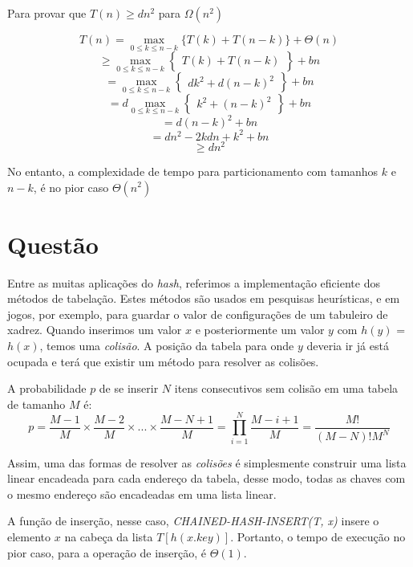 \documentclass[a4paper,12pt]{article}
\begin{document}
\begin{description}
	Para provar que $T(n) \ge dn^2$ para $\Omega(n^2)$
	
	$$ T(n) = \max_{0 \leq k \leq n-k} \{T(k)+T(n-k)\}+\Theta(n) $$
	$$
	{\ge} \max_{0 \leq k \leq n-k} \left\{\begin{array}{rc}
	T(k)+T(n-k)
	\end{array}\right\} + bn
	$$ 
	$$
	=\max_{0 \leq k \leq n-k} \left\{\begin{array}{rc}
	dk^2+d(n-k)^2
	\end{array}\right\} + bn
	$$ 
	$$
	=d \max_{0 \leq k \leq n-k} \left\{\begin{array}{rc}
	k^2+(n-k)^2
	\end{array}\right\} + bn
	$$ 
	$$=d (n-k)^2 + bn$$
	$$ =dn^2-2kdn + k^2 + bn $$
	$$ {\ge} dn^2 $$
	
	No entanto, a complexidade de tempo para particionamento com tamanhos $k$ e $n-k$, é no pior caso $\Theta(n^2)$  
	
\end{description}

\section{Questão}
Entre as muitas aplicações do \textit{hash}, referimos a implementação eficiente dos métodos de tabelação. Estes métodos são usados em pesquisas heurísticas, e em jogos, por exemplo, para guardar o valor de configurações de um tabuleiro de xadrez.
Quando inserimos um valor $x$ e posteriormente um valor $y$ com $h(y)$ = $h(x)$, temos uma \textit{colisão}. A posição da tabela para onde $y$ deveria ir já está ocupada e terá que existir um método para resolver as colisões.

A probabilidade $p$ de se inserir $N$ itens consecutivos sem colisão em uma tabela de tamanho $M$ é:
	$$
	p = \frac{M-1}{M}\times\frac{M-2}{M}\times...\times\frac{M-N+1}{M} = \prod \limits_{i=1}^N \frac{M-i+1}{M} = \frac{M!}{(M-N)!M^N}
	$$

Assim, uma das formas de resolver as \textit{colisões} é simplesmente construir uma lista linear encadeada para cada endereço da tabela, desse modo, todas as chaves com o mesmo endereço são encadeadas em uma lista linear.

A função de inserção, nesse caso, \textit{CHAINED-HASH-INSERT(T, x)} insere o elemento $x$ na cabeça da lista $T[h(x.key)]$. Portanto, o tempo de execução no pior caso, para a operação de inserção, é $\Theta(1)$.
\end{document}
